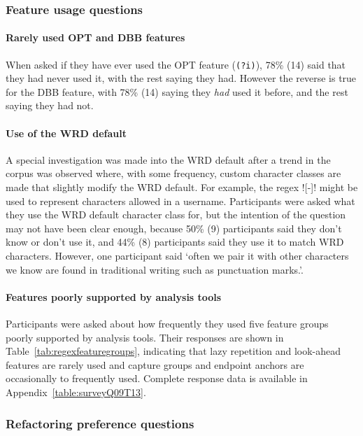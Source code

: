 

\subsubsection{Feature usage questions}

\paragraph{Rarely used OPT and DBB features}  When asked if they have ever used the OPT feature (\verb!(?i)!), 78\% (14) said that they had never used it, with the rest saying they had.  However the reverse is true for the DBB feature, with 78\% (14) saying they \emph{had} used it before, and the rest saying they had not.

\paragraph{Use of the WRD default}  A special investigation was made into the WRD default after a trend in the corpus was observed where, with some frequency, custom character classes are made that slightly modify the WRD default.  For example, the regex \cverb![\w-]! might be used to represent characters allowed in a username.
Participants were asked what they use the WRD default character class for, but the intention of the question may not have been clear enough, because 50\% (9) participants said they don't know or don't use it, and 44\% (8) participants said they use it to match WRD characters.  However, one participant said `often we pair it with other characters we know are found in traditional writing such as punctuation marks.'.

\paragraph{Features poorly supported by analysis tools} Participants were asked about how frequently they used five feature groups poorly supported by analysis tools.  Their responses are shown in Table~\ref{tab:regexfeaturegroups}, indicating that lazy repetition and look-ahead features are rarely used and capture groups and endpoint anchors are occasionally to frequently used. Complete response data is available in Appendix~\ref{table:surveyQ09T13}.



\subsubsection{Refactoring preference questions}
